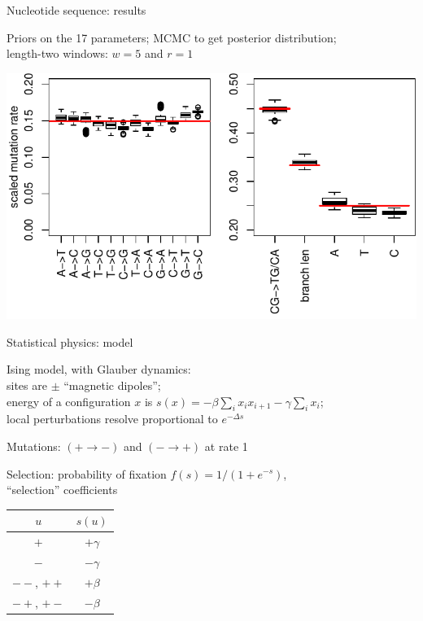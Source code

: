 \documentclass[smaller]{beamer}
\begin{document}
\begin{frame}{Nucleotide sequence: results}

  Priors on the 17 parameters; MCMC to get posterior distribution;\\
  \hspace{2em} length-two windows: $w=5$ and $r=1$

  \begin{center}
\includegraphics[width=\textwidth]{../../../writeup-plots/selsims-2013-06-03-13-17-0187525-estimate-boxplots}
\end{center}

\end{frame}

\begin{frame}{Statistical physics: model}

  Ising model, with Glauber dynamics: \\
  \hspace{2em} sites are $\pm $ ``magnetic dipoles''; \\
  \hspace{2em}   energy of a configuration $x$ is $s(x) = - \beta \sum_i x_i x_{i+1} - \gamma \sum_i x_i$; \\
   \hspace{2em}  local perturbations resolve proportional to $e^{-\Delta s}$

   \vspace{2em}

   Mutations: $(+ \to -)$ and $(- \to +)$ at rate 1

   \vspace{2em}

  Selection: probability of fixation $f(s) = 1/(1+e^{-s})$, \\
  \hspace{3em} ``selection'' coefficients
  \begin{center}
    \begin{tabular}{c|c}
      $u$  &  $s(u)$ \\
      \hline
      $+$ & $+\gamma$ \\
      $-$ & $-\gamma$ \\
      $--$, $++$  & $+\beta$ \\
      $-+$, $+-$  & $-\beta$ 
    \end{tabular}
  \end{center}

\end{frame}
\end{document}

